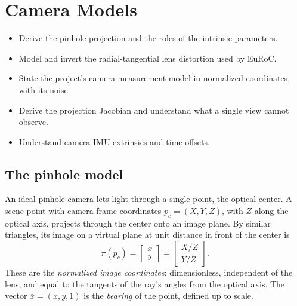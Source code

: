 \chapter{Camera Models}
\label{ch:camera}

\begin{objectives}
\begin{itemize}
  \item Derive the pinhole projection and the roles of the intrinsic parameters.
  \item Model and invert the radial-tangential lens distortion used by EuRoC.
  \item State the project's camera measurement model in normalized coordinates, with its noise.
  \item Derive the projection Jacobian and understand what a single view cannot observe.
  \item Understand camera-IMU extrinsics and time offsets.
\end{itemize}
\end{objectives}

\section{The pinhole model}

An ideal pinhole camera lets light through a single point, the optical center. A scene point with camera-frame
coordinates $p_c = (X, Y, Z)$, with $Z$ along the optical axis, projects through the center onto an image plane.
By similar triangles, its image on a virtual plane at unit distance in front of the center is
\begin{equation}
  \pi(p_c) = \begin{bmatrix} x \\ y \end{bmatrix} = \begin{bmatrix} X/Z \\ Y/Z \end{bmatrix}.
  \label{eq:pinhole}
\end{equation}
These are the \emph{normalized image coordinates}: dimensionless, independent of the lens, and equal to the
tangents of the ray's angles from the optical axis. The vector $\bar x = (x, y, 1)$ is the \emph{bearing} of the point,
defined up to scale.

